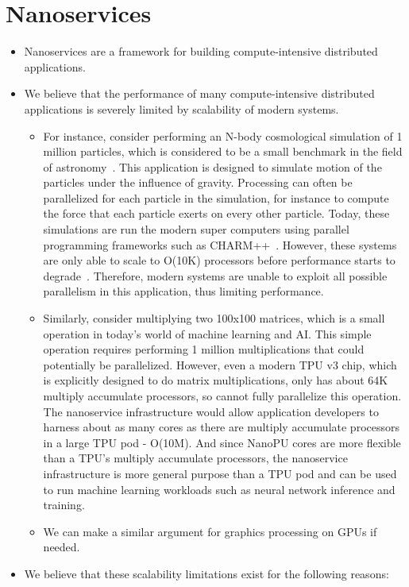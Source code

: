 \section{Nanoservices}
\begin{itemize}
    \item Nanoservices are a framework for building compute-intensive distributed applications.
    \item We believe that the performance of many compute-intensive distributed applications is severely limited by scalability of modern systems.
    \begin{itemize}
        \item For instance, consider performing an N-body cosmological simulation of 1 million particles, which is considered to be a small benchmark in the field of astronomy~\cite{changa}. This application is designed to simulate motion of the particles under the influence of gravity. Processing can often be parallelized for each particle in the simulation, for instance to compute the force that each particle exerts on every other particle. Today, these simulations are run the modern super computers using parallel programming frameworks such as CHARM++~\cite{charm++}. However, these systems are only able to scale to O(10K) processors before performance starts to degrade~\cite{changa}. Therefore, modern systems are unable to exploit all possible parallelism in this application, thus limiting performance.
        \item Similarly, consider multiplying two 100x100 matrices, which is a small operation in today's world of machine learning and AI. This simple operation requires performing 1 million multiplications that could potentially be parallelized. However, even a modern TPU v3 chip, which is explicitly designed to do matrix multiplications, only has about 64K multiply accumulate processors, so cannot fully parallelize this operation. The nanoservice infrastructure would allow application developers to harness about as many cores as there are multiply accumulate processors in a large TPU pod - O(10M). And since NanoPU cores are more flexible than a TPU's multiply accumulate processors, the nanoservice infrastructure is more general purpose than a TPU pod and can be used to run machine learning workloads such as neural network inference and training.
        \item We can make a similar argument for graphics processing on GPUs if needed.
    \end{itemize}
    \item We believe that these scalability limitations exist for the following reasons:

\end{itemize}
